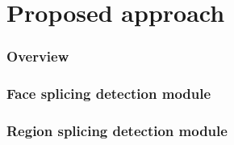 \chapter{Proposed approach}

\subsection{Overview}

\subsection{Face splicing detection module}

\subsection{Region splicing detection module}
